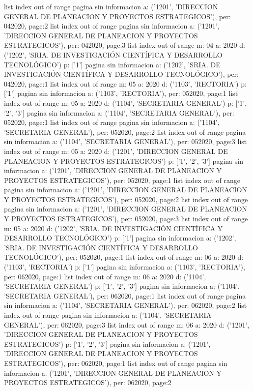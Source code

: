 \documentclass[11pt]{article}
\begin{document}
list index out of range
pagina sin informacion a: ('1201', 'DIRECCION GENERAL DE PLANEACION Y PROYECTOS ESTRATEGICOS'), per: 042020, page:2
list index out of range
pagina sin informacion a: ('1201', 'DIRECCION GENERAL DE PLANEACION Y PROYECTOS ESTRATEGICOS'), per: 042020, page:3
list index out of range
m: 04 a: 2020 d: ('1202', 'SRIA. DE INVESTIGACIÓN CIENTÍFICA Y DESARROLLO TECNOLÓGICO') p: ['1']
pagina sin informacion a: ('1202', 'SRIA. DE INVESTIGACIÓN CIENTÍFICA Y DESARROLLO TECNOLÓGICO'), per: 042020, page:1
list index out of range
m: 05 a: 2020 d: ('1103', 'RECTORIA') p: ['1']
pagina sin informacion a: ('1103', 'RECTORIA'), per: 052020, page:1
list index out of range
m: 05 a: 2020 d: ('1104', 'SECRETARIA GENERAL') p: ['1', '2', '3']
pagina sin informacion a: ('1104', 'SECRETARIA GENERAL'), per: 052020, page:1
list index out of range
pagina sin informacion a: ('1104', 'SECRETARIA GENERAL'), per: 052020, page:2
list index out of range
pagina sin informacion a: ('1104', 'SECRETARIA GENERAL'), per: 052020, page:3
list index out of range
m: 05 a: 2020 d: ('1201', 'DIRECCION GENERAL DE PLANEACION Y PROYECTOS ESTRATEGICOS') p: ['1', '2', '3']
pagina sin informacion a: ('1201', 'DIRECCION GENERAL DE PLANEACION Y PROYECTOS ESTRATEGICOS'), per: 052020, page:1
list index out of range
pagina sin informacion a: ('1201', 'DIRECCION GENERAL DE PLANEACION Y PROYECTOS ESTRATEGICOS'), per: 052020, page:2
list index out of range
pagina sin informacion a: ('1201', 'DIRECCION GENERAL DE PLANEACION Y PROYECTOS ESTRATEGICOS'), per: 052020, page:3
list index out of range
m: 05 a: 2020 d: ('1202', 'SRIA. DE INVESTIGACIÓN CIENTÍFICA Y DESARROLLO TECNOLÓGICO') p: ['1']
pagina sin informacion a: ('1202', 'SRIA. DE INVESTIGACIÓN CIENTÍFICA Y DESARROLLO TECNOLÓGICO'), per: 052020, page:1
list index out of range
m: 06 a: 2020 d: ('1103', 'RECTORIA') p: ['1']
pagina sin informacion a: ('1103', 'RECTORIA'), per: 062020, page:1
list index out of range
m: 06 a: 2020 d: ('1104', 'SECRETARIA GENERAL') p: ['1', '2', '3']
pagina sin informacion a: ('1104', 'SECRETARIA GENERAL'), per: 062020, page:1
list index out of range
pagina sin informacion a: ('1104', 'SECRETARIA GENERAL'), per: 062020, page:2
list index out of range
pagina sin informacion a: ('1104', 'SECRETARIA GENERAL'), per: 062020, page:3
list index out of range
m: 06 a: 2020 d: ('1201', 'DIRECCION GENERAL DE PLANEACION Y PROYECTOS ESTRATEGICOS') p: ['1', '2', '3']
pagina sin informacion a: ('1201', 'DIRECCION GENERAL DE PLANEACION Y PROYECTOS ESTRATEGICOS'), per: 062020, page:1
list index out of range
pagina sin informacion a: ('1201', 'DIRECCION GENERAL DE PLANEACION Y PROYECTOS ESTRATEGICOS'), per: 062020, page:2
\end{document}
